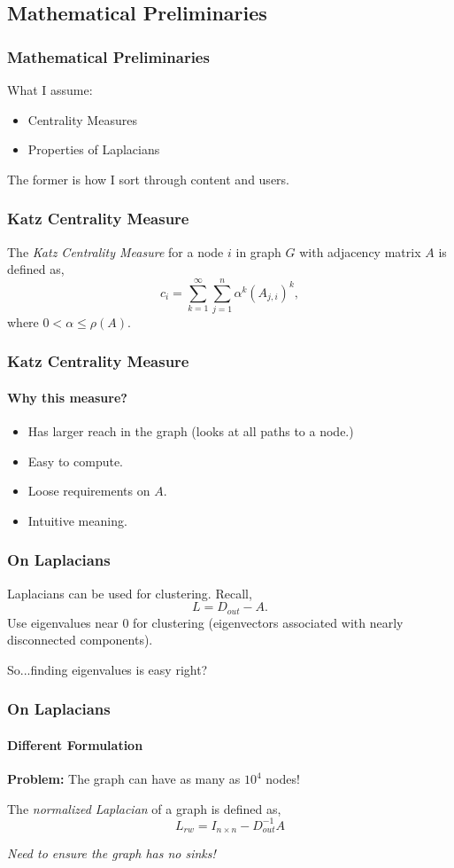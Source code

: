 \documentclass[frame number]{beamer}
\begin{document}
\subsection{Mathematical Preliminaries}
\begin{frame}
  \frametitle{Mathematical Preliminaries}
  What I assume:
  \begin{itemize}
    \item{Centrality Measures}
    \item{Properties of Laplacians}
  \end{itemize}
  The former is how I sort through content and users.
\end{frame}
\begin{frame}
  \frametitle{Katz Centrality Measure}
  \begin{definition}
    The \emph{Katz Centrality Measure} for a node \(i\) in graph \(G\) with adjacency matrix \(A\) is defined as,
    \[
      c_i = \sum_{k=1}^\infty \sum_{j=1}^n \alpha^k \left( A_{j,i} \right)^k,
    \]
    where \(0 < \alpha \leq \rho(A).\)
  \end{definition}
\end{frame}
\begin{frame}
  \frametitle{Katz Centrality Measure}
  \framesubtitle{Why this measure?}
  \begin{itemize}
    \item{Has larger reach in the graph (looks at all paths to a node.)}
    \item{Easy to compute.}
    \item{Loose requirements on \(A.\)}
    \item{Intuitive meaning.}
  \end{itemize}
\end{frame}
\begin{frame}
  \frametitle{On Laplacians}
  Laplacians can be used for clustering. Recall,
  \[
    L = D_{out} - A.
  \]
  Use eigenvalues near 0 for clustering (eigenvectors associated with nearly disconnected components).
  \pause

  So...finding eigenvalues is easy right?
\end{frame}
\begin{frame}
  \frametitle{On Laplacians}
  \framesubtitle{Different Formulation}
  \textbf{Problem:} The graph can have as many as \(10^4\) nodes!
  \pause
  \begin{definition}
    The \emph{normalized Laplacian} of a graph is defined as,
    \[
      L_{rw} = I_{n\times n} - D_{out}^{-1} A
    \]
  \end{definition}
  \pause
  \emph{Need to ensure the graph has no sinks!}
\end{frame}
\end{document}
